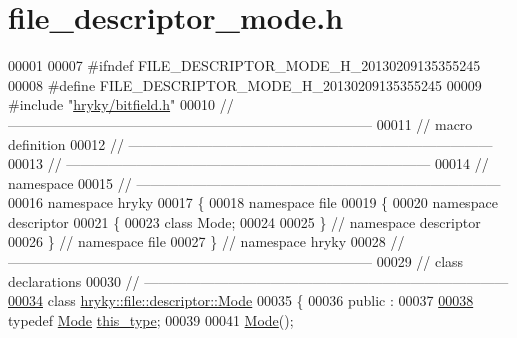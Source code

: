 \hypertarget{file__descriptor__mode_8h_source}{\section{file\-\_\-descriptor\-\_\-mode.\-h}
}

\begin{DoxyCode}
00001 
00007 \textcolor{preprocessor}{#ifndef FILE\_DESCRIPTOR\_MODE\_H\_20130209135355245}
00008 \textcolor{preprocessor}{}\textcolor{preprocessor}{#define FILE\_DESCRIPTOR\_MODE\_H\_20130209135355245}
00009 \textcolor{preprocessor}{}\textcolor{preprocessor}{#include "\hyperlink{bitfield_8h}{hryky/bitfield.h}"}
00010 \textcolor{comment}{//
      ------------------------------------------------------------------------------}
00011 \textcolor{comment}{// macro definition}
00012 \textcolor{comment}{//
      ------------------------------------------------------------------------------}
00013 \textcolor{comment}{//
      ------------------------------------------------------------------------------}
00014 \textcolor{comment}{// namespace}
00015 \textcolor{comment}{//
      ------------------------------------------------------------------------------}
00016 \textcolor{keyword}{namespace }hryky
00017 \{
00018 \textcolor{keyword}{namespace }file
00019 \{
00020 \textcolor{keyword}{namespace }descriptor
00021 \{
00023     \textcolor{keyword}{class }Mode;
00024 
00025 \} \textcolor{comment}{// namespace descriptor}
00026 \} \textcolor{comment}{// namespace file}
00027 \} \textcolor{comment}{// namespace hryky}
00028 \textcolor{comment}{//
      ------------------------------------------------------------------------------}
00029 \textcolor{comment}{// class declarations}
00030 \textcolor{comment}{//
      ------------------------------------------------------------------------------}
\hypertarget{file__descriptor__mode_8h_source_l00034}{}\hyperlink{classhryky_1_1file_1_1descriptor_1_1_mode}{00034} \textcolor{comment}{}\textcolor{keyword}{class }\hyperlink{classhryky_1_1file_1_1descriptor_1_1_mode}{hryky::file::descriptor::Mode}
00035 \{
00036 \textcolor{keyword}{public} :
00037 
\hypertarget{file__descriptor__mode_8h_source_l00038}{}\hyperlink{classhryky_1_1file_1_1descriptor_1_1_mode_a06dd006ab194ebabae7e2b324246df44}{00038}     \textcolor{keyword}{typedef} \hyperlink{classhryky_1_1file_1_1descriptor_1_1_mode}{Mode} \hyperlink{classhryky_1_1file_1_1descriptor_1_1_mode_a06dd006ab194ebabae7e2b324246df44}{this_type};
00039 
00041     \hyperlink{classhryky_1_1file_1_1descriptor_1_1_mode_a86f797b62eb4fdd0cb39bd7f82a92ddf}{Mode}();

\end{DoxyCode}
